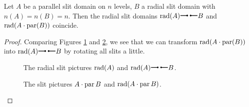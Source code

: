 \begin{prop}
   Let $A$ be a parallel slit domain on $n$ levels, $B$ a radial slit domain with $n(A) = n(B) = n$. 
   Then the radial slit domains $\radmap(A) \radmult B$ and $\operatorname{rad}(A \cdot \operatorname{par}(B))$ coincide.
\begin{proof}
   Comparing Figures \ref{homology_op:comparison_par_rad_formula2_part_1} and \ref{homology_op:comparison_par_rad_formula2_part_2},
   we see that we can transform $\operatorname{rad}(A \cdot \operatorname{par}(B))$ into $\radmap(A) \radmult B$ by rotating all slits a little.

  \begin{figure}[ht]
  \centering
  \caption{\label{homology_op:comparison_par_rad_formula2_part_1} The radial slit pictures $\operatorname{rad}(A)$ and $\radmap(A) \radmult B$.}
  \end{figure}
  
  \begin{figure}[ht]
  \centering
  \caption{\label{homology_op:comparison_par_rad_formula2_part_2} The slit pictures $A \cdot \operatorname{par} B$ and $\operatorname{rad}(A \cdot \operatorname{par} B)$.}
  \end{figure}

\end{proof}

\end{prop}
